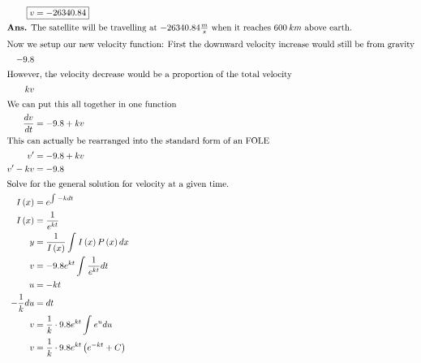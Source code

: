 \documentclass[12pt]{article}
\begin{document}
\begin{align}
  \Aboxed{v               & =-26340.84}                                                                    \\
  \intertext{\textbf{Ans.} The satellite will be travelling at $-26340.84\frac{m}{s}$ when it reaches $600\:km$ above earth.}
  \intertext{Now we setup our new velocity function: First the downward velocity increase would still be from gravity}
  -9.8                                                                                                     \\
  \intertext{However, the velocity decrease would be a proportion of the total velocity}
  kv                                                                                                       \\
  \intertext{We can put this all together in one function}
  \frac{dv}{dt}           & =-9.8+kv                                                                       \\
  \intertext{This can actually be rearranged into the standard form of an FOLE}
  v'                      & =-9.8+kv                                                                       \\
  v'-kv                   & =-9.8                                                                          \\
  \intertext{Solve for the general solution for velocity at a given time.}
  I\left(x\right)         & =e^{\int_{ }^{ }-kdt}                                                          \\
  I\left(x\right)         & =\frac{1}{e^{kt}}                                                              \\
  y                       & =\frac{1}{I\left(x\right)}\int_{ }^{ }I\left(x\right)P\left(x\right)dx         \\
  v                       & =-9.8e^{kt}\int_{ }^{ }\frac{1}{e^{kt}}dt                                      \\
  u                       & =-kt                                                                           \\
  -\frac{1}{k}du          & =dt                                                                            \\
  v                       & =\frac{1}{k}\cdot9.8e^{kt}\int_{ }^{ }e^{u}du                                  \\
  v                       & =\frac{1}{k}\cdot9.8e^{kt}\left(e^{-kt}+C\right)                               \\

\end{align}
\end{document}
